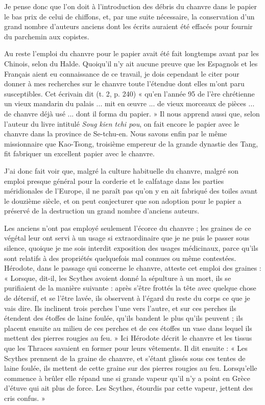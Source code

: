 \documentclass[a4paper, 11pt, oneside, polutonikogreek]{article}
\begin{document}
Je pense donc que l'on doit à l'introduction des débris du chanvre dans le papier le bas prix de celui de chiffons, et, par une suite nécessaire, la conservation d'un grand nombre d'auteurs anciens dont les écrits auraient été effacés pour fournir du parchemin aux copistes.

Au reste l'emploi du chanvre pour le papier avait été fait longtemps avant par les Chinois, selon du Halde. Quoiqu'il n'y ait aucune preuve que les Espagnols et les Français aient eu connaissance de ce travail, je dois cependant le citer pour donner à mes recherches sur le chanvre toute l'étendue dont elles m'ont paru susceptibles. Cet écrivain dit (t. 2, p. 240) « qu'en l'année 95 de l'ère chrétienne un vieux mandarin du palais ... mit en œuvre ... de vieux morceaux de pièces ... de chanvre déjà usé ... dont il forma du papier. » Il nous apprend aussi que, selon l'auteur du livre intitulé \emph{Soug kien tchi pou}, on fait encore le papier avec le chanvre dans la province de Se-tchu-en. Nous savons enfin par le même missionnaire que Kao-Tsong, troisième empereur de la grande dynastie des Tang, fit fabriquer un excellent papier avec le chanvre.

J'ai donc fait voir que, malgré la culture habituelle du chanvre, malgré son emploi presque général pour la corderie et le calfatage dans les parties méridionales de l'Europe, il ne paraît pas qu'on y en ait fabriqué des toiles avant le douzième siècle, et on peut conjecturer que son adoption pour le papier a préservé de la destruction un grand nombre d'anciens auteurs.

Les anciens n'ont pas employé seulement l'écorce du chanvre ; les graines de ce végétal leur ont servi à un usage si extraordinaire que je ne puis le passer sous silence, quoique je me sois interdit exposition des usages médicinaux, parce qu'ils sont relatifs à des propriétés quelquefois mal connues ou même contestées. Hérodote, dans le passage qui concerne le chanvre, atteste cet emploi des graines : « Lorsque, dit-il, les Scythes avoient donné la sépulture à un mort, ils se purifiaient de la manière suivante : après s'être frottés la tête avec quelque chose de détersif, et se l'être lavée, ils observent à l'égard du reste du corps ce que je vais dire. Ils inclinent trois perches l'une vers l'autre, et sur ces perches ils étendent des étoffes de laine foulée, qu'ils bandent le plus qu'ils peuvent ; ils placent ensuite au milieu de ces perches et de ces étoffes un vase dans lequel ils mettent des pierres rougies au feu. » Ici Hérodote décrit le chanvre et les tissus que les Thraces savaient en former pour leurs vêtements. Il dit ensuite : « Les Scythes prennent de la graine de chanvre, et s'étant glissés sous ces tentes de laine foulée, ils mettent de cette graine sur des pierres rougies au feu. Lorsqu'elle commence à brûler elle répand une si grande vapeur qu'il n'y a point en Grèce d'étuve qui ait plus de force. Les Scythes, étourdis par cette vapeur, jettent des cris confus. »
\end{document}
